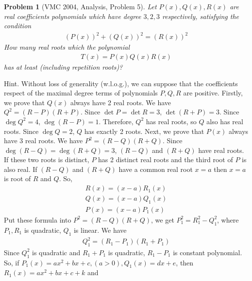 \documentclass{article}
\newtheorem{problem}{Problem}
\begin{document}
\begin{problem}[VMC 2004, Analysis, Problem 5]
	Let $P(x),Q(x),R(x)$ are real coefficients polynomials which have degree $3,2,3$ respectively, satisfying the condition 
	\begin{align}
		{\left( {P\left( x \right)} \right)^2} + {\left( {Q\left( x \right)} \right)^2} = {\left( {R\left( x \right)} \right)^2}
	\end{align}
	How many real roots which the polynomial 
	\begin{align}
		T\left( x \right) = P\left( x \right)Q\left( x \right)R\left( x \right)
	\end{align}
	has at least (including repetition roots)?
\end{problem}
{\sf Hint.} Without loss of generality (w.l.o.g.), we can suppose that the coefficients respect of the maximal degree terms of polynomials $P,Q,R$ are positive. Firstly, we prove that $Q(x)$ always have 2 real roots. We have ${Q^2} = \left( {R - P} \right)\left( {R + P} \right)$. Since $\det P = \det R = 3$, $\det (R+P)=3$. Since $\deg {Q^2} = 4$, $\deg (R-P)=1$. Therefore, $Q^2$ has real roots, so $Q$ also has real roots. Since $\deg Q =2$, $Q$ has exactly 2 roots. Next, we prove that $P(x)$ always have 3 real roots. We have ${P^2} = \left( {R - Q} \right)\left( {R + Q} \right)$. Since $\deg \left( {R - Q} \right) = \deg \left( {R + Q} \right) = 3$, $(R-Q)$ and $(R+Q)$ have real roots. If these two roots is distinct, $P$ has 2 distinct real roots and the third root of $P$ is also real. If $(R-Q)$ and $(R+Q)$ have a common real root $x=a$ then $x=a$ is root of $R$ and $Q$. So, 
\begin{align}
	R\left( x \right) = \left( {x - a} \right){R_1}\left( x \right)\\
	Q\left( x \right) = \left( {x - a} \right){Q_1}\left( x \right)\\
	P\left( x \right) = \left( {x - a} \right){P_1}\left( x \right)
\end{align}
Put these formula into ${P^2} = \left( {R - Q} \right)\left( {R + Q} \right)$, we get $P_1^2 = R_1^2 - Q_1^2$, where $P_1,R_1$ is quadratic, $Q_1$ is linear. We have 
\begin{align}
	Q_1^2 = \left( {{R_1} - {P_1}} \right)\left( {{R_1} + {P_1}} \right)
\end{align}
Since $Q_1^2$ is quadratic and $R_1+P_1$ is quadratic, $R_1-P_1$ is constant polynomial. So, if ${P_1}\left( x \right) = a{x^2} + bx + c,\left( {a > 0} \right),{Q_1}\left( x \right) = dx + e$, then ${R_1}\left( x \right) = a{x^2} + bx + c + k$ and 
\end{document}
